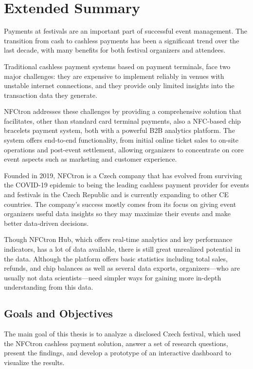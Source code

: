 \chapter*{Extended Summary}
\label{ch:extended-summary}
Payments at festivals are an important part of successful event management.
The transition from cash to cashless payments has been a significant trend over the last decade, with many benefits for both festival organizers and attendees.

Traditional cashless payment systems based on payment terminals, face two major challenges: they are expensive to implement reliably in venues with unstable internet connections, and they provide only limited insights into the transaction data they generate.

NFCtron addresses these challenges by providing a comprehensive solution that facilitates, other than standard card terminal payments, also a NFC-based chip bracelets payment system, both with a powerful B2B analytics platform.
The system offers end-to-end functionality, from initial online ticket sales to on-site operations and post-event settlement, allowing organizers to concentrate on core event aspects such as marketing and customer experience.

Founded in 2019, NFCtron is a Czech company that has evolved from surviving the COVID-19 epidemic to being the leading cashless payment provider for events and festivals in the Czech Republic and is currently expanding to other CE countries.
The company's success mostly comes from its focus on giving event organizers useful data insights so they may maximize their events and make better data-driven decisions.

Though NFCtron Hub, which offers real-time analytics and key performance indicators, has a lot of data available, there is still great unrealized potential in the data.
Although the platform offers basic statistics including total sales, refunds, and chip balances as well as several data exports, organizers—who are usually not data scientists—need simpler ways for gaining more in-depth understanding from this data.

\section*{Goals and Objectives}
\label{sec:goals-and-objectives}
The main goal of this thesis is to analyze a disclosed Czech festival, which used the NFCtron cashless payment solution, answer a set of research questions, present the findings, and develop a prototype of an interactive dashboard to visualize the results.

